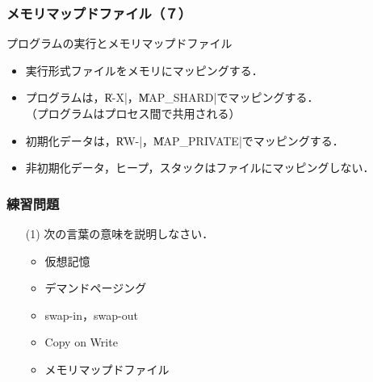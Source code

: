 \documentclass{beamer}                   %
\begin{document}
\begin{frame}[fragile]
  \frametitle{メモリマップドファイル（７）}
  プログラムの実行とメモリマップドファイル
  \begin{itemize}
  \item 実行形式ファイルをメモリにマッピングする．
  \item プログラムは，\|R-X|，\|MAP_SHARD|でマッピングする．\\
    （プログラムはプロセス間で共用される）
  \item 初期化データは，\|RW-|，\|MAP_PRIVATE|でマッピングする．
  \item 非初期化データ，ヒープ，スタックはファイルにマッピングしない．
  \end{itemize}
\end{frame}

\begin{frame}
  \frametitle{練習問題}
  \begin{enumerate}
  \item[(1)] 次の言葉の意味を説明しなさい．
    \begin{itemize}
      \item 仮想記憶
      \item デマンドページング
      \item swap-in，swap-out
      \item Copy on Write
      \item メモリマップドファイル
    \end{itemize}
  \end{enumerate}
\end{frame}
\end{document}
